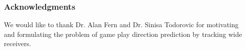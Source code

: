 \documentclass{article} %
\begin{document}
%
%
% 
% 


\subsubsection*{Acknowledgments}

We would like to thank Dr. Alan Fern and  Dr. Sinisa Todorovic for motivating and formulating the problem of game play direction prediction by tracking wide receivers.

\end{document}

